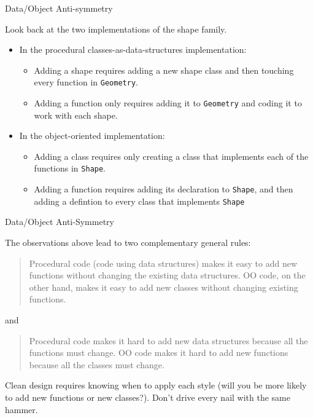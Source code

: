\documentclass{beamer}
\begin{document}
\begin{frame}[fragile]{Data/Object Anti-symmetry}


Look back at the two implementations of the shape family.
\begin{itemize}
\item In the procedural classes-as-data-structures implementation:
\begin{itemize}
\item Adding a shape requires adding a new shape class and then touching every function in {\tt Geometry}.
\item Adding a function only requires adding it to {\tt Geometry} and coding it to work with each shape.
\end{itemize}
\item In the object-oriented implementation:
\begin{itemize}
\item Adding a class requires only creating a class that implements each of the functions in {\tt Shape}.
\item Adding a function requires adding its declaration to {\tt Shape}, and then adding a defintion to every class that implements {\tt Shape}
\end{itemize}
\end{itemize}


\end{frame}

\begin{frame}[fragile]{Data/Object Anti-Symmetry}


The observations above lead to two complementary general rules:
\begin{quote}
Procedural code (code using data structures) makes it easy to add new functions without changing the existing data structures. OO code, on the other hand, makes it easy to add new classes without changing existing functions.
\end{quote}
and
\begin{quote}
Procedural code makes it hard to add new data structures because all the functions must change. OO code makes it hard to add new functions because all the classes must change.
\end{quote}

Clean design requires knowing when to apply each style (will you be more likely to add new functions or new classes?).  Don't drive every nail with the same hammer.

\end{frame}
\end{document}
